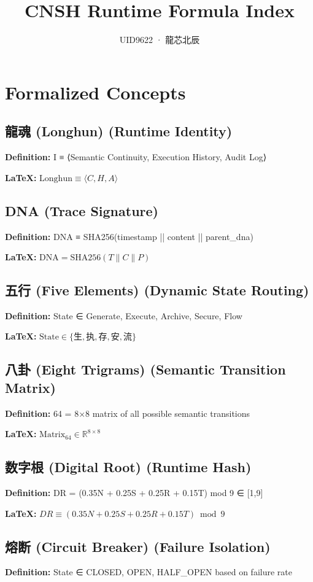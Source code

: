 \documentclass[11pt]{article}
\title{CNSH Runtime Formula Index}
\author{UID9622 · 龍芯北辰}
\begin{document}
\section{Formalized Concepts}

\subsection{龍魂 (Longhun) (Runtime Identity)}
\textbf{Definition:} I ≡ ⟨Semantic Continuity, Execution History, Audit Log⟩

\textbf{LaTeX:} $\text{Longhun} \equiv \langle C, H, A \rangle$

\subsection{DNA (Trace Signature)}
\textbf{Definition:} DNA ≡ SHA256(timestamp || content || parent_dna)

\textbf{LaTeX:} $\text{DNA} = \text{SHA256}(T \| C \| P)$

\subsection{五行 (Five Elements) (Dynamic State Routing)}
\textbf{Definition:} State ∈ {Generate, Execute, Archive, Secure, Flow}

\textbf{LaTeX:} $\text{State} \in \{\text{生}, \text{执}, \text{存}, \text{安}, \text{流}\}$

\subsection{八卦 (Eight Trigrams) (Semantic Transition Matrix)}
\textbf{Definition:} 64 = 8×8 matrix of all possible semantic transitions

\textbf{LaTeX:} $\text{Matrix}_{64} \in \mathbb{R}^{8 \times 8}$

\subsection{数字根 (Digital Root) (Runtime Hash)}
\textbf{Definition:} DR = (0.35N + 0.25S + 0.25R + 0.15T) mod 9 ∈ [1,9]

\textbf{LaTeX:} $DR \equiv (0.35N + 0.25S + 0.25R + 0.15T) \bmod 9$

\subsection{熔断 (Circuit Breaker) (Failure Isolation)}
\textbf{Definition:} State ∈ {CLOSED, OPEN, HALF_OPEN} based on failure rate
\end{document}
